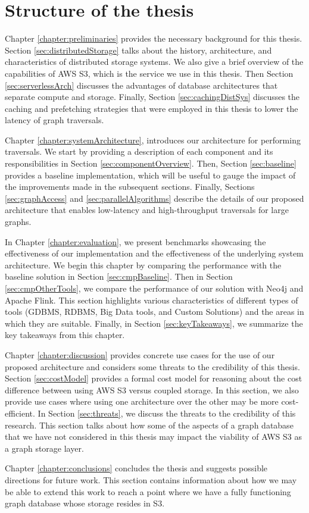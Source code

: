 \section{Structure of the thesis}

\medskip
Chapter \ref{chapter:preliminaries} provides the necessary background for
this thesis. Section \ref{sec:distributedStorage} talks about the
history, architecture, and characteristics of distributed storage systems. We
also give a brief overview of the capabilities of AWS S3, which is the service
we use in this thesis. Then
Section \ref{sec:serverlessArch} discusses the advantages of database
architectures that separate compute and storage. Finally, 
Section \ref{sec:cachingDistSys} discusses the caching and prefetching
strategies that were employed in this thesis to lower the latency of graph
traversals.

\medskip
Chapter \ref{chapter:systemArchitecture}, introduces our architecture for
performing traversals. We start by providing a description of each component and
its responsibilities in Section \ref{sec:componentOverview}. 
Then, Section \ref{sec:baseline} provides a baseline implementation, 
which will be useful to gauge
the impact of the improvements made in the subsequent sections. Finally, 
Sections \ref{sec:graphAccess} and \ref{sec:parallelAlgorithms} 
describe the details of our proposed architecture
that enables low-latency and high-throughput traversals for large graphs.

\medskip
In Chapter \ref{chapter:evaluation}, we present benchmarks showcasing the
effectiveness of our implementation and the effectiveness of the underlying 
system architecture. We begin this chapter by
comparing the performance with the baseline solution in
Section \ref{sec:cmpBaseline}. Then in Section \ref{sec:cmpOtherTools}, we
compare the performance of our solution with Neo4j and Apache Flink. This
section highlights various characteristics of different types of tools (GDBMS,
RDBMS, Big Data tools, and Custom Solutions) and the areas in which they 
are suitable. Finally, in Section \ref{sec:keyTakeaways}, we summarize the key
takeaways from this chapter.

\medskip
Chapter \ref{chapter:discussion} provides concrete use cases for the use of our
proposed architecture and considers some threats to the credibility of this
thesis. Section \ref{sec:costModel} provides a formal cost model for reasoning
about the cost difference between using AWS S3 versus coupled storage. In this
section, we also provide use cases where using one architecture over the other
may be more cost-efficient. In Section \ref{sec:threats}, we discuss the threats
to the credibility of this research. This section talks about how some of the
aspects of a graph database that we have not considered in this thesis may
impact the viability of AWS S3 as a graph storage layer. 

\medskip
Chapter \ref{chapter:conclusions} concludes the thesis and
suggests possible directions for future work. This section contains information
about how we may be able to extend this work to reach a point where we have a
fully functioning graph database whose storage resides in S3.

